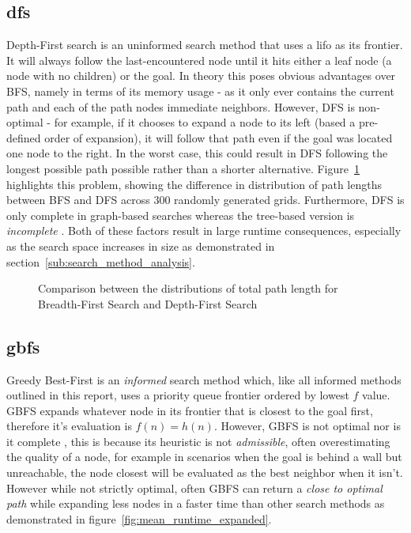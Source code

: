 \subsection{\texorpdfstring{\acrfull{dfs}}{DFS}} %
\label{sub:dfs}
Depth-First search is an uninformed search method that uses a \acrfull{lifo} as its frontier. It will always follow the last-encountered node until it hits either a leaf node (a node with no children) or the goal. In theory this poses obvious advantages over BFS, namely in terms of its memory usage - as it only ever contains the current path and each of the path nodes immediate neighbors. However, DFS is non-optimal - for example, if it chooses to expand a node to its left (based a pre-defined order of expansion), it will follow that path even if the goal was located one node to the right. In the worst case, this could result in DFS following the longest possible path possible rather than a shorter alternative. Figure~\ref{fig:dfs_bfs_length} highlights this problem, showing the difference in distribution of path lengths between BFS and DFS across 300 randomly generated grids. Furthermore, DFS is only complete in graph-based searches whereas the tree-based version is \textit{incomplete} \parencite[86]{aiama}. Both of these factors result in large runtime consequences, especially as the search space increases in size as demonstrated in section~\ref{sub:search_method_analysis}.

\begin{figure}[H]
	\hfill
	\hfill
	\caption{Comparison between the distributions of total path length for Breadth-First Search and Depth-First Search}
	\label{fig:dfs_bfs_length}
\end{figure}

\subsection{\texorpdfstring{\acrfull{gbfs}}{GBFS}} %
\label{sub:gbfs}
Greedy Best-First is an \textit{informed} search method which, like all informed methods outlined in this report, uses a priority queue frontier ordered by lowest $f$ value. GBFS expands whatever node in its frontier that is closest to the goal first, therefore it's evaluation is $f(n)=h(n)$. However, GBFS is not optimal nor is it complete \parencite{aiasa}, this is because its heuristic is not \textit{admissible}, often overestimating the quality of a node, for example in scenarios when the goal is behind a wall but unreachable, the node closest will be evaluated as the best neighbor when it isn't. However while not strictly optimal, often GBFS can return a \textit{close to optimal path} while expanding less nodes in a faster time than other search methods as demonstrated in figure~\ref{fig:mean_runtime_expanded}.

